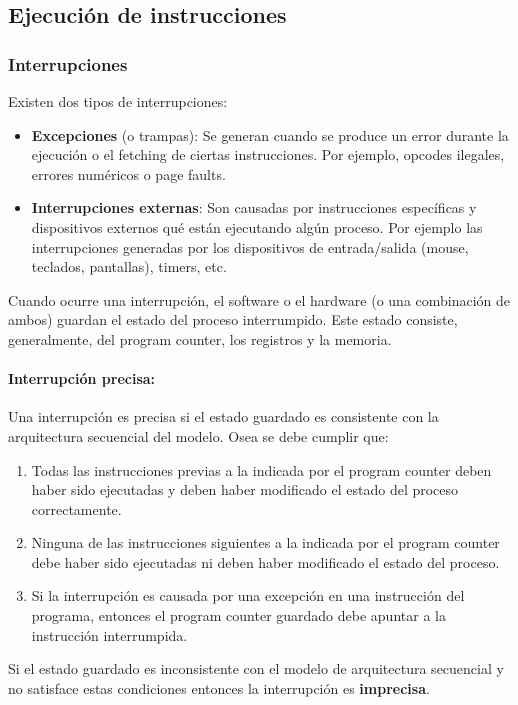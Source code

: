 \subsection{Ejecución de instrucciones}
\subsubsection{Interrupciones}
Existen dos tipos de interrupciones:
\begin{itemize}
	\item \textbf{Excepciones} (o trampas): Se generan cuando se produce un error durante la ejecución o el fetching de ciertas instrucciones. Por ejemplo, opcodes ilegales, errores numéricos o page faults.
	\item \textbf{Interrupciones externas}: Son causadas por instrucciones específicas y dispositivos externos qué están ejecutando algún proceso. Por ejemplo las interrupciones generadas por los dispositivos de entrada/salida (mouse, teclados, pantallas), timers, etc.
\end{itemize}

Cuando ocurre una interrupción, el software o el hardware (o una combinación de ambos) guardan el estado del proceso interrumpido. Este estado consiste, generalmente, del program counter, los registros y la memoria.

\paragraph{Interrupción precisa:} Una interrupción es precisa si el estado guardado es consistente con la arquitectura secuencial del modelo. Osea se debe cumplir que:
\begin{enumerate}
	\item Todas las instrucciones previas a la indicada por el program counter deben haber sido ejecutadas y deben haber modificado el estado del proceso correctamente.
	\item Ninguna de las instrucciones siguientes a la indicada por el program counter debe haber sido ejecutadas ni deben haber modificado el estado del proceso.
	\item Si la interrupción es causada por una excepción en una instrucción del programa, entonces el program counter guardado debe apuntar a la instrucción interrumpida.
\end{enumerate}

Si el estado guardado es inconsistente con el modelo de arquitectura secuencial y no satisface estas condiciones entonces la interrupción es \textbf{imprecisa}. 

